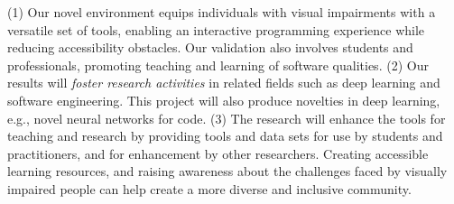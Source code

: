 \documentclass[11pt]{article}
\newcommand{\tool}{\textsc{LLM-V2C}\xspace}
\begin{document}
(1)
Our novel environment equips individuals with visual impairments with
a versatile set of tools, enabling an interactive programming
experience while reducing accessibility obstacles.
%
%
Our validation also involves students and professionals, promoting
teaching and learning of software qualities.
(2) Our results will {\em foster research activities} in related
fields such as deep learning and software engineering. This project
will also produce novelties in deep learning, e.g., novel neural
networks for code. (3) The research will enhance the tools for
teaching and research by providing tools and data sets for use by
students and practitioners, and for enhancement by other
researchers. Creating accessible learning resources, and raising
awareness about the challenges faced by visually impaired people
can help create a more diverse and inclusive community.






\end{document}
